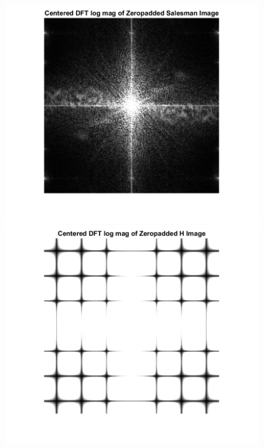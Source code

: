 \documentclass[11pt]{article} %
\begin{document}
\begin{figure}
\centering
	\includegraphics{1be.png}
	\includegraphics{1bf.png}
\end{figure}
\end{document}
